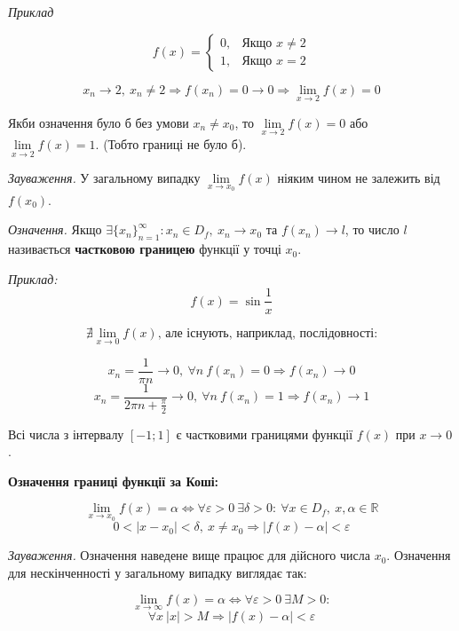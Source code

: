 \documentclass[12pt]{report}
\begin{document}
\textit{Приклад}

$$f(x) = \begin{cases}0, &\textrm{Якщо $x \neq 2$}  
\\ 1, &\textrm{Якщо $x = 2$} \end{cases}$$

$$x_n \to 2,\ x_n \neq 2 \Rightarrow f(x_n) = 0 \to 0 \Rightarrow \lim_{x \to 2}f(x) = 0$$

Якби означення було б без умови $x_n \neq x_0$, то $\lim\limits_{x \to 2}f(x) = 0$ або $\lim\limits_{x \to 2}f(x) = 1$. (Тобто границі не було б).

\vspace{3mm}

\textit{Зауваження.} У загальному випадку $\lim\limits_{x \to x_0}f(x)$ ніяким чином не залежить від $f(x_0)$.

\vspace{5mm}

\textit{Означення.} Якщо $\exists \{ x_n \}_{n=1}^{\infty} : x_n \in D_f,\ x_n \to x_0$ та $f(x_n) \to l$, то число $l$ називається \textbf{частковою границею} функції у точці $x_0$.

\textit{Приклад:}
$$f(x) = \sin \frac{1}{x}$$

$$\nexists \lim_{x \to 0} f(x) \textrm{, але існують, наприклад, послідовності:}$$

$$x_n = \frac{1}{\pi n} \to 0,\ \forall n \ f(x_n) = 0  \Rightarrow f(x_n) \to 0$$
$$x_n = \frac{1}{2\pi  n + \frac{\pi}{2}} \to 0,\ \forall n \ f(x_n) = 1  \Rightarrow f(x_n) \to 1$$

Всі числа з інтервалу $[-1;1]$ є частковими границями функції $f(x)$ при $x \to 0$.

\vspace{5mm}

\textbf{Означення границі функції за Коші:}

$$\lim_{x \to x_0} f(x) = \alpha \Longleftrightarrow \forall \varepsilon > 0 \ \exists \delta > 0 : \ \forall x \in D_f,\ x, \alpha \in \mathbb{R}$$
$$ 0 < |x - x_0| < \delta,\ x \neq x_0 \Longrightarrow |f(x) - \alpha| < \varepsilon$$

\textit{Зауваження.} Означення наведене вище працює для дійсного числа $x_0$. Означення для нескінченності у загальному випадку виглядає так:

$$\lim_{x \to \infty} f(x) = \alpha \Longleftrightarrow \forall \varepsilon > 0  \ \exists M > 0 : $$
$$\forall x \ |x| > M \Longrightarrow |f(x) - \alpha| < \varepsilon$$
\end{document}
